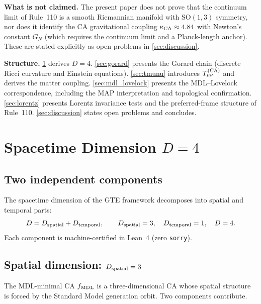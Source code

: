 \documentclass[11pt]{article}
\theoremstyle{remark}
\newcommand{\kCA}{\kappa_{\rm CA}}
\newcommand{\fmdl}{f_{\rm MDL}}
\begin{document}
\noindent
\textbf{What is not claimed.}
The present paper does not prove that the continuum limit of Rule~110 is a
smooth Riemannian manifold with $\mathrm{SO}(1,3)$ symmetry, nor does it
identify the CA gravitational coupling $\kCA \approx 4.84$ with Newton's
constant $G_N$ (which requires the continuum limit and a Planck-length
anchor).
These are stated explicitly as open problems in \cref{sec:discussion}.

\medskip
\noindent
\textbf{Structure.}
\cref{sec:dimension} derives $D = 4$.
\cref{sec:gorard} presents the Gorard chain (discrete Ricci curvature and
Einstein equations).
\cref{sec:tmunu} introduces $T_{\mu\nu}^{(\rm CA)}$ and derives the matter
coupling.
\cref{sec:mdl_lovelock} presents the MDL--Lovelock correspondence, including
the MAP interpretation and topological confirmation.
\cref{sec:lorentz} presents Lorentz invariance tests and the preferred-frame
structure of Rule~110.
\cref{sec:discussion} states open problems and concludes.

\section{Spacetime Dimension \texorpdfstring{$D = 4$}{D=4}}
\label{sec:dimension}

\subsection{Two independent components}
\label{ssec:dim_components}

The spacetime dimension of the GTE framework decomposes into spatial and
temporal parts:
\begin{equation}
  D = D_{\rm spatial} + D_{\rm temporal},
  \qquad D_{\rm spatial} = 3, \quad D_{\rm temporal} = 1,
  \quad D = 4.
  \label{eq:dim_decomp}
\end{equation}
Each component is machine-certified in Lean~4 (zero \texttt{sorry}).

\subsection{Spatial dimension: \texorpdfstring{$D_{\rm spatial} = 3$}{D\_spatial=3}}
\label{ssec:spatial_dim}

The MDL-minimal CA $\fmdl$ is a three-dimensional CA whose spatial structure
is forced by the Standard Model generation orbit.
Two components contribute.
\end{document}
